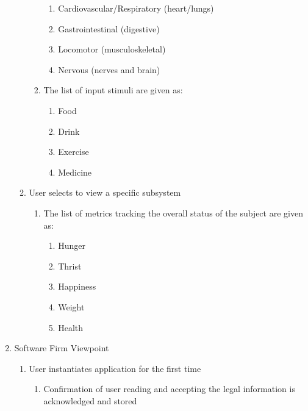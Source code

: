 \documentclass[]{article}
\begin{document}
\begin{enumerate}
\begin{enumerate}
\begin{enumerate}
        \begin{enumerate}
            \item Cardiovascular/Respiratory (heart/lungs)
            \item Gastrointestinal (digestive)
            \item Locomotor (musculoskeletal)
            \item Nervous (nerves and brain)
        \end{enumerate}
        \item The list of input stimuli are given as:
        \begin{enumerate}
            \item Food
            \item Drink
            \item Exercise
            \item Medicine
        \end{enumerate}
        \end{enumerate}
        \item User selects to view a specific subsystem
        \begin{enumerate}
           \item The list of metrics tracking the overall status of the subject are given as:
            \begin{enumerate}
                \item Hunger
                \item Thrist
                \item Happiness
                \item Weight
                \item Health
	        \end{enumerate} 
        \end{enumerate}

	\end{enumerate}
	\item Software Firm Viewpoint
	\begin{enumerate}
	    \item User instantiates application for the first time
	    \begin{enumerate}
	        \item Confirmation of user reading and accepting the legal information is acknowledged and stored
	    \end{enumerate}
	\end{enumerate}
\end{enumerate}
\end{document}
